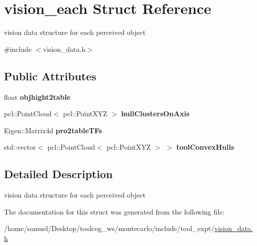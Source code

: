 \hypertarget{structvision__each}{}\section{vision\+\_\+each Struct Reference}
\label{structvision__each}


vision data structure for each perceived object  




{\ttfamily \#include $<$vision\+\_\+data.\+h$>$}

\subsection*{Public Attributes}
\begin{DoxyCompactItemize}
\item 
\mbox{\label{structvision__each_a25bf76acb8b6a1982d999a40096723ed}} 
float {\bfseries objhight2table}
\item 
\mbox{\label{structvision__each_a2f4bb00a2e1f488638a78d4a17ae53ee}} 
pcl\+::\+Point\+Cloud$<$ pcl\+::\+Point\+X\+YZ $>$ {\bfseries hull\+Clusters\+On\+Axis}
\item 
\mbox{\label{structvision__each_a3d1af1b6d83107928261d6a5ab284305}} 
Eigen\+::\+Matrix4d {\bfseries pro2table\+T\+Fs}
\item 
\mbox{\label{structvision__each_af8d6a66c06896fba07031a719be69274}} 
std\+::vector$<$ pcl\+::\+Point\+Cloud$<$ pcl\+::\+Point\+X\+YZ $>$ $>$ {\bfseries tool\+Convex\+Hulls}
\end{DoxyCompactItemize}


\subsection{Detailed Description}
vision data structure for each perceived object 

The documentation for this struct was generated from the following file\+:\begin{DoxyCompactItemize}
\item 
/home/samuel/\+Desktop/toolcog\+\_\+ws/montecarlo/include/tool\+\_\+expt/\hyperlink{vision__data_8h}{vision\+\_\+data.\+h}\end{DoxyCompactItemize}
